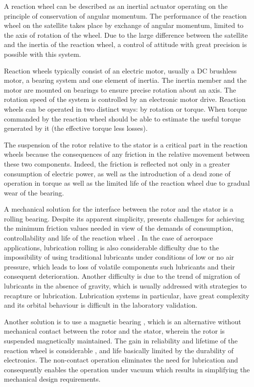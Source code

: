 \documentclass[10pt,fleqn,a4paper,twoside]{article}
\begin{document}
A reaction wheel can be described as an inertial actuator operating on the principle of conservation of angular momentum. The performance of the reaction wheel on the satellite takes place by exchange of angular momentum, limited to the axis of rotation of the wheel. Due to the large difference between the satellite and the inertia of the reaction wheel, a control of attitude with great precision is possible with this system.

Reaction wheels typically consist of an electric motor, usually a DC brushless motor, a bearing system and one element of inertia. The inertia member and the motor are mounted on bearings to ensure precise rotation about an axis. The rotation speed of the system is controlled by an electronic motor drive. Reaction wheels can be operated in two distinct ways: by rotation or torque. When torque commanded by the reaction wheel should be able to estimate the useful torque generated by it (the effective torque less losses).

The suspension of the rotor relative to the stator is a critical part in the reaction wheels \cite{taniwaki2003experimental} because the consequences of any friction in the relative movement between these two components. Indeed, the friction is reflected not only in a greater consumption of electric power, as well as the introduction of a dead zone of operation in torque as well as the limited life of the reaction wheel due to gradual wear of the bearing.

A  mechanical solution for the interface between the rotor and the stator is a rolling bearing. Despite its apparent simplicity, presents challenges for achieving the minimum friction values needed in view of the demands of consumption, controllability and life of the reaction wheel \cite{Krishnan2010}. In the case of aerospace applications, lubrication rolling is also considerable difficulty due to the impossibility of using traditional lubricants under conditions of low or no air pressure, which leads to loss of volatile components such lubricants and their consequent deterioration. Another difficulty is due to the trend of migration of lubricants in the absence of gravity, which is usually addressed with strategies to recapture or lubrication. Lubrication systems in particular, have great complexity and its orbital behaviour is difficult in the laboratory validation.

Another solution is to use a magnetic bearing \cite{Bangcheng2012}, which is an alternative without mechanical contact between the rotor and the stator, wherein the rotor is suspended magnetically maintained. The gain in reliability and lifetime of the reaction wheel is considerable \cite{Marble2006}, and life basically limited by the durability of electronics. The non-contact operation eliminates the need for lubrication and consequently enables the operation under vacuum which results in simplifying the mechanical design requirements.
\end{document}
